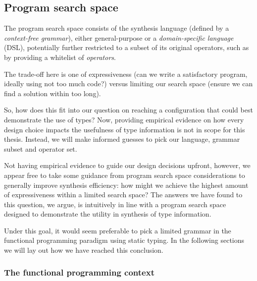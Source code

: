 \documentclass{article}
\begin{document}
\subsection{Program search space}

The program search space consists of the synthesis language (defined by a \emph{context-free grammar}),
either general-purpose or a \emph{domain-specific language} (DSL),
potentially further restricted to a subset of its original operators,
such as by providing a whitelist of \emph{operators}.

The trade-off here is one of expressiveness (can we write a satisfactory program, ideally using not too much code?) versus limiting our search space (ensure we can find a solution within too long).

So, how does this fit into our question on reaching a configuration that could best demonstrate the use of types?
Now, providing empirical evidence on how every design choice impacts the usefulness of type information is not in scope for this thesis.
Instead, we will make informed guesses
to pick our language, grammar subset and operator set.

Not having empirical evidence to guide our design decisions upfront, however,
we appear free to take some guidance from program search space considerations to generally improve synthesis efficiency:
how might we achieve the highest amount of expressiveness within a limited search space?
The answers we have found to this question, we argue,
is intuitively in line with a program search space designed to demonstrate the utility in synthesis of type information.

Under this goal, it would seem preferable to pick a limited grammar in the functional programming paradigm using static typing.
In the following sections we will lay out how we have reached this conclusion.

\subsubsection{The functional programming context}
\end{document}

